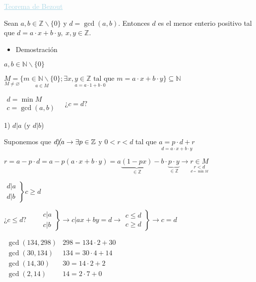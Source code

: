 \documentclass[12pt]{article}
\begin{document}
\textcolor{lightblue}{\underline{Teorema de Bezout}}

Sean $a,b\in\mathbb{Z}\backslash\{0\}$ y $d=\gcd(a,b)$. Entonces $d$ es el menor enterio positivo tal que $d=a\cdot x+b\cdot y,~x,y\in\mathbb{Z}$.
\begin{itemize}[label=\color{red}\textbullet, leftmargin=*]
	\item \color{lightblue}Demostración
\end{itemize}
$a,b\in\mathbb{N}\backslash\{0\}$

$\underset{M\neq\varnothing}{M=}\{\underset{a\in M}{m\in\mathbb{N}\backslash\{0\}};\underset{a=a\cdot 1+b\cdot 0}{\exists x,y\in\mathbb{Z}\text{ tal que }}m=a\cdot x+b\cdot y\}\subseteq\mathbb{N}$

$\begin{array}{l}
	d=\min M\\
	c=\gcd(a,b)
\end{array}\quad\text{¿}c=d?$

1) $d|a$ (y $d|b$)

Suponemos que $d\cancel{\backslash}a\rightarrow\exists p\in\mathbb{Z}$ y $0<r<d$ tal que $ \underset{\displaystyle d=a\cdot x+b\cdot y}{a=p\cdot d+r}$

$r=a-p\cdot d=a-p(a\cdot x+b\cdot y)=a\underbrace{(1-px)}_{\in\mathbb{Z}}-b\cdot\underbrace{p\cdot y}_{\in\mathbb{Z}}\rightarrow \underset{\underset{\displaystyle d=\min M}{\displaystyle r<d}}{r\in M}$

$\left.\begin{array}{l}
	d|a\\
	d|b
\end{array}\right\}c\ge d$

¿$c\le d?\qquad\left.\begin{array}{c}
	c|a\\
	c|b
\end{array}\right\}\rightarrow c|ax+by=d\rightarrow\left.\begin{array}{c}
c\le d\\
c\ge d
\end{array}\right\}\rightarrow c=d$

$\begin{array}{cl}
	\gcd(134,298) & 298=134\cdot 2+30\\
	\gcd(30,134) & 134=30\cdot 4+14\\
	\gcd(14,30) & 30=14\cdot 2+2\\
	\gcd(2, 14) & 14=2\cdot7+0
\end{array}$
\end{document}
